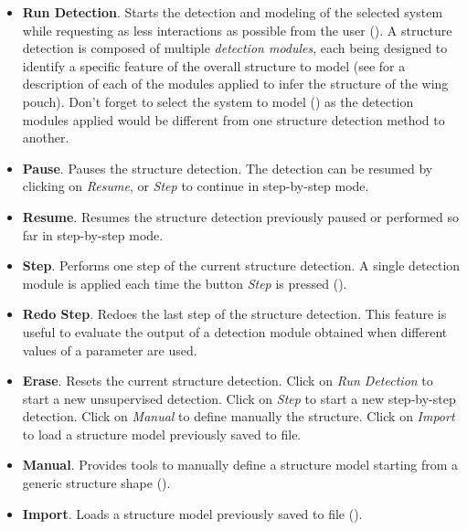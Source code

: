 \begin{itemize}
 \item \textbf{Run Detection}. Starts the detection and modeling of the selected system while requesting as less interactions as possible from the user (). A structure detection is composed of multiple \textit{detection modules}, each being designed to identify a specific feature of the overall structure to model (see  for a description of each of the modules applied to infer the structure of the wing pouch). Don't forget to select the system to model () as the detection modules applied would be different from one structure detection method to another.

 \item \textbf{Pause}. Pauses the structure detection. The detection can be resumed by clicking on \textit{Resume}, or \textit{Step} to continue in step-by-step mode.

 \item \textbf{Resume}. Resumes the structure detection previously paused or performed so far in step-by-step mode.

 \item \textbf{Step}. Performs one step of the current structure detection. A single detection module is applied each time the button \textit{Step} is pressed ().

 \item \textbf{Redo Step}. Redoes the last step of the structure detection. This feature is useful to evaluate the output of a detection module obtained when different values of a parameter are used.

 \item \textbf{Erase}. Resets the current structure detection. Click on \textit{Run Detection} to start a new unsupervised detection. Click on \textit{Step} to start a new step-by-step detection. Click on \textit{Manual} to define manually the structure. Click on \textit{Import} to load a \wingj structure model previously saved to file.

 \item \textbf{Manual}. Provides tools to manually define a structure model starting from a generic structure shape ().

 \item \textbf{Import}. Loads a structure model previously saved to file ().
\end{itemize}


